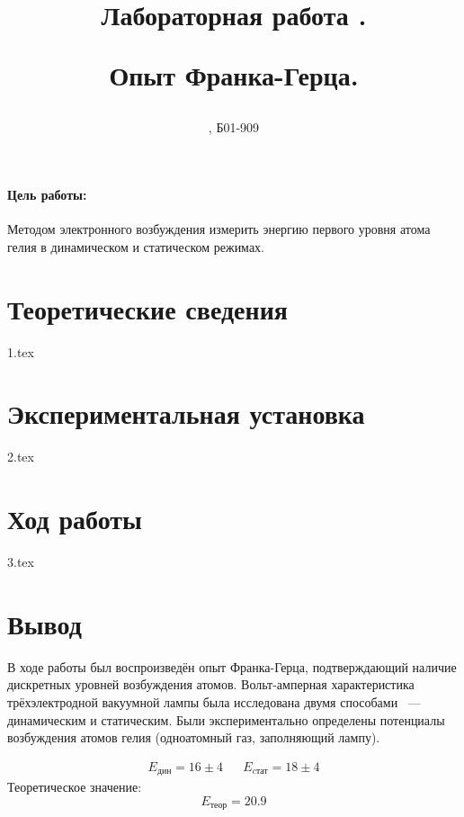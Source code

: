 \documentclass[a5paper, 10pt, twoside]{article} %
\title
{\hfill \break  \hfill \break
\hfill \break  \hfill \break
Лабораторная работа \LNUM.

Опыт Франка-Герца.
}
\author{\SMB, Б01-909}
\begin{document}
\maketitle



\thispagestyle{empty} %

\newpage

\tableofcontents %
\thispagestyle{plain}
\newpage


\paragraph{Цель работы:}
Методом электронного возбуждения измерить энергию первого уровня атома гелия в динамическом и статическом режимах.

\section{Теоретические сведения}
{1.tex}

\newpage
\section{Экспериментальная установка}
{2.tex}

\newpage
\section{Ход работы}
{3.tex}

\newpage
\section{Вывод}

В ходе работы был воспроизведён опыт Франка-Герца, подтверждающий наличие
дискретных уровней возбуждения атомов. Вольт-амперная характеристика
трёхэлектродной вакуумной лампы была исследована двумя способами ~---~ динамическим и
статическим. Были экспериментально определены потенциалы возбуждения
атомов гелия (одноатомный газ, заполняющий лампу).

\begin{align*}
  E_{дин} = 16 \pm 4 &&
  E_{cтат} = 18 \pm 4
\end{align*}
Теоретическое значение:
$$
E_{теор} = 20.9
$$
\end{document}
